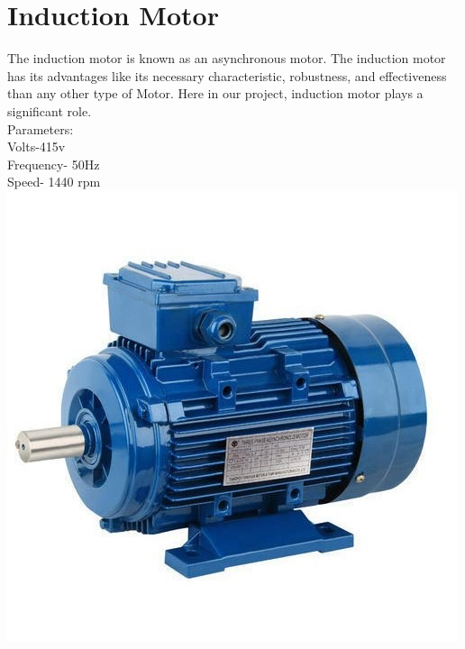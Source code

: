 \section{Induction Motor}
The induction motor is known as an asynchronous motor. The induction motor has its advantages like its necessary characteristic, robustness, and effectiveness than any other type of Motor. Here in our project, induction motor plays a significant role.\\
Parameters:\\
Volts-415v \\
Frequency- 50Hz\\
Speed- 1440 rpm\\
{\includegraphics[height=0.2\textheight]{Figures/motor.jpg}}

